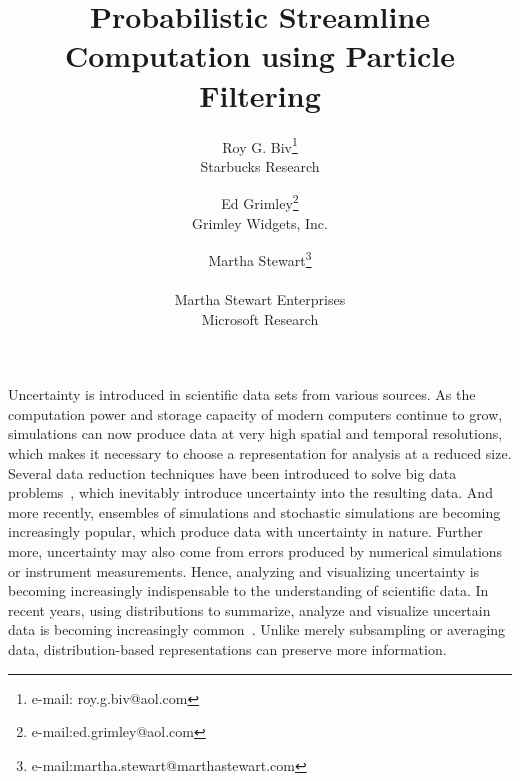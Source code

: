 \documentclass[review]{vgtc}                 %
\title{Probabilistic Streamline Computation using Particle Filtering}
\author{Roy G. Biv\thanks{e-mail: roy.g.biv@aol.com}\\ %
        \scriptsize Starbucks Research %
\and Ed Grimley\thanks{e-mail:ed.grimley@aol.com}\\ %
     \scriptsize Grimley Widgets, Inc. %
\and Martha Stewart\thanks{e-mail:martha.stewart@marthastewart.com}\\ %
     \parbox{1.4in}{\scriptsize \centering Martha Stewart Enterprises \\ Microsoft Research}}
\begin{document}


\maketitle

Uncertainty is introduced in scientific data sets from various sources. As the computation power and storage capacity of modern computers continue to grow, simulations can now produce data at very high spatial and temporal resolutions, which makes it necessary to choose a representation for analysis at a reduced size. Several data reduction techniques have been introduced to solve big data problems~\cite{6378985, 7156380, conf/ldav/LiuLBP12, DBLP:conf/ldav/ThompsonLBBGPP11}, which inevitably introduce uncertainty into the resulting data. And more recently, ensembles of simulations and stochastic simulations are becoming increasingly popular, which produce data with uncertainty in nature. Further more, uncertainty may also come from errors produced by numerical simulations or instrument measurements. Hence, analyzing and visualizing uncertainty is becoming increasingly indispensable to the understanding of scientific data. In recent years, using distributions to summarize, analyze and visualize uncertain data is becoming increasingly common~\cite{6378985, 7156380, DBLP:conf/ldav/ThompsonLBBGPP11}. Unlike merely subsampling or averaging data, distribution-based representations can preserve more information.
\end{document}
